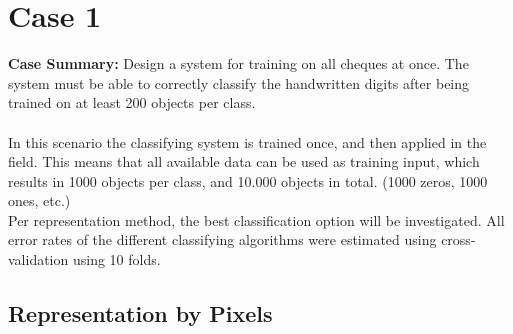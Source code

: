 \newpage
\section{Case 1}
\label{sec:Case1}
\textbf{Case Summary:} Design a system for training on all cheques at once. The system must be able to correctly classify the handwritten digits after being trained on at least 200 objects per class.\\
\\
In this scenario the classifying system is trained once, and then applied in the field. This means that all available data can be used as training input, which results in 1000 objects per class, and 10.000 objects in total. (1000 zeros, 1000 ones, etc.) \\
Per representation method, the best classification option will be investigated. All error rates of the different classifying algorithms were estimated using cross-validation using 10 folds.\\

\subsection{Representation by Pixels}
